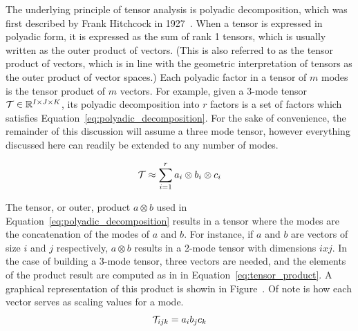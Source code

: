 \documentclass[../ut-dissertation.tex]{subfiles}
\begin{document}
The underlying principle of tensor analysis is polyadic decomposition,
which was first described by Frank Hitchcock in
1927~\cite{hitchcock1927}.  When a tensor is expressed in polyadic
form, it is expressed as the sum of rank 1 tensors, which is usually
written as the outer product of vectors.  (This is also referred to as
the tensor product of vectors, which is in line with the geometric
interpretation of tensors as the outer product of vector spaces.)
Each polyadic factor in a tensor of $m$ modes is the tensor product of
$m$ vectors.  For example, given a 3-mode tensor $\mathcal{T} \in
\mathbb{R}^{I\times J \times K}$, its polyadic decomposition into $r$ factors
is a set of factors which satisfies
Equation~\ref{eq:polyadic_decomposition}.  For the sake of
convenience, the remainder of this discussion will assume a three
mode tensor, however everything discussed here can readily be extended
to any number of modes.

\begin{equation} \label{eq:polyadic_decomposition}
  \mathcal{T} \approx \displaystyle\sum_{i=1}^{r} a_i \otimes b_i
  \otimes c_i
\end{equation}

The tensor, or outer,  product $a \otimes b$ used in
Equation~\ref{eq:polyadic_decomposition} results in a tensor where the
modes are the concatenation of the modes of $a$ and $b$.  For
instance, if $a$ and $b$ are vectors of size $i$ and $j$ respectively,
$a \otimes b$ results in a 2-mode tensor with dimensions $i x j$.  In
the case of building a 3-mode tensor, three vectors are needed, and
the elements of the product result are computed as in in
Equation~\ref{eq:tensor_product}. A graphical representation of this
product is showin in Figure~\label{fig:tensor_product}.  Of note is
how each vector serves as scaling values for a mode.  
\begin{equation} \label{eq:tensor_product}
  \mathcal{T}_{ijk} = a_i b_j c_k
\end{equation}
\end{document}
